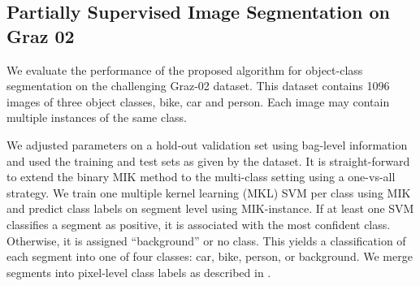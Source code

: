 \subsection{Partially Supervised Image Segmentation on Graz 02}

We evaluate the performance of the proposed algorithm for object-class
segmentation on the challenging Graz-02 dataset.
This dataset contains 1096 images of three object classes, bike, car and person.
Each image may contain multiple instances of the same class.

We adjusted parameters on a hold-out validation set using bag-level information and used the
training and test sets as given by the dataset.
It is straight-forward to extend the binary MIK method to the multi-class
setting using a one-vs-all strategy.
We train one multiple kernel learning (MKL) SVM per class using MIK and predict class labels on segment level
using MIK-instance. If at least one SVM classifies a segment as positive,
it is associated with the most confident class. Otherwise, it is assigned
``background'' or no class.
This yields a classification of each segment into one of four classes: car, bike, person,
or background. We merge segments into pixel-level class labels as described
in .

